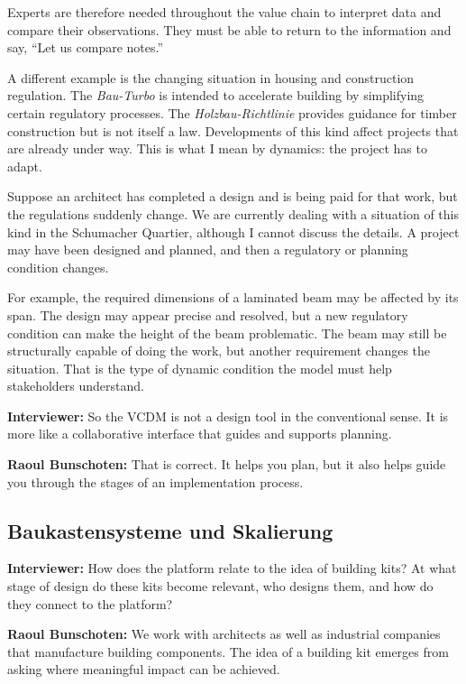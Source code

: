 Experts are therefore needed throughout the value chain to interpret data and compare their observations. They must be able to return to the information and say, “Let us compare notes.”

A different example is the changing situation in housing and construction regulation. The \textit{Bau-Turbo} is intended to accelerate building by simplifying certain regulatory processes. The \textit{Holzbau-Richtlinie} provides guidance for timber construction but is not itself a law. Developments of this kind affect projects that are already under way. This is what I mean by dynamics: the project has to adapt.

Suppose an architect has completed a design and is being paid for that work, but the regulations suddenly change. We are currently dealing with a situation of this kind in the Schumacher Quartier, although I cannot discuss the details. A project may have been designed and planned, and then a regulatory or planning condition changes.

For example, the required dimensions of a laminated beam may be affected by its span. The design may appear precise and resolved, but a new regulatory condition can make the height of the beam problematic. The beam may still be structurally capable of doing the work, but another requirement changes the situation. That is the type of dynamic condition the model must help stakeholders understand.

\textbf{Interviewer:} So the VCDM is not a design tool in the conventional sense. It is more like a collaborative interface that guides and supports planning.

\textbf{Raoul Bunschoten:} That is correct. It helps you plan, but it also helps guide you through the stages of an implementation process.

\subsection{Baukastensysteme und Skalierung}

\textbf{Interviewer:} How does the platform relate to the idea of building kits? At what stage of design do these kits become relevant, who designs them, and how do they connect to the platform?

\textbf{Raoul Bunschoten:} We work with architects as well as industrial companies that manufacture building components. The idea of a building kit emerges from asking where meaningful impact can be achieved.

